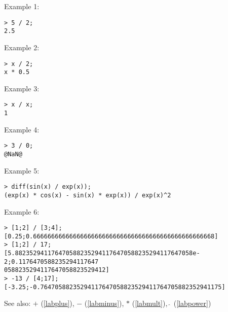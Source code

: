 \noindent Example 1: 
\begin{center}\begin{minipage}{15cm}\begin{Verbatim}[frame=single]
> 5 / 2;
2.5
\end{Verbatim}
\end{minipage}\end{center}
\noindent Example 2: 
\begin{center}\begin{minipage}{15cm}\begin{Verbatim}[frame=single]
> x / 2;
x * 0.5
\end{Verbatim}
\end{minipage}\end{center}
\noindent Example 3: 
\begin{center}\begin{minipage}{15cm}\begin{Verbatim}[frame=single]
> x / x;
1
\end{Verbatim}
\end{minipage}\end{center}
\noindent Example 4: 
\begin{center}\begin{minipage}{15cm}\begin{Verbatim}[frame=single]
> 3 / 0;
@NaN@
\end{Verbatim}
\end{minipage}\end{center}
\noindent Example 5: 
\begin{center}\begin{minipage}{15cm}\begin{Verbatim}[frame=single]
> diff(sin(x) / exp(x));
(exp(x) * cos(x) - sin(x) * exp(x)) / exp(x)^2
\end{Verbatim}
\end{minipage}\end{center}
\noindent Example 6: 
\begin{center}\begin{minipage}{15cm}\begin{Verbatim}[frame=single]
> [1;2] / [3;4];
[0.25;0.66666666666666666666666666666666666666666666666668]
> [1;2] / 17;
[5.8823529411764705882352941176470588235294117647058e-2;0.1176470588235294117647
0588235294117647058823529412]
> -13 / [4;17];
[-3.25;-0.76470588235294117647058823529411764705882352941175]
\end{Verbatim}
\end{minipage}\end{center}
See also: \textbf{$+$} (\ref{labplus}), \textbf{$-$} (\ref{labminus}), \textbf{$*$} (\ref{labmult}), \textbf{$\mathbf{\hat{~}}$} (\ref{labpower})
